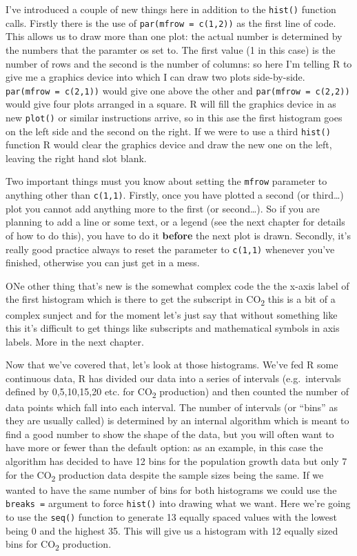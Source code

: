 \documentclass[
]{book}
\begin{document}
I've introduced a couple of new things here in addition to the \texttt{hist()} function calls. Firstly there is the use of \texttt{par(mfrow\ =\ c(1,2))} as the first line of code. This allows us to draw more than one plot: the actual number is determined by the numbers that the paramter os set to. The first value (1 in this case) is the number of rows and the second is the number of columns: so here I'm telling R to give me a graphics device into which I can draw two plots side-by-side. \texttt{par(mfrow\ =\ c(2,1))} would give one above the other and \texttt{par(mfrow\ =\ c(2,2))} would give four plots arranged in a square. R will fill the graphics device in as new \texttt{plot()} or similar instructions arrive, so in this ase the first histogram goes on the left side and the second on the right. If we were to use a third \texttt{hist()} function R would clear the graphics device and draw the new one on the left, leaving the right hand slot blank.

Two important things must you know about setting the \texttt{mfrow} parameter to anything other than \texttt{c(1,1)}. Firstly, once you have plotted a second (or third\ldots) plot you cannot add anything more to the first (or second\ldots). So if you are planning to add a line or some text, or a legend (see the next chapter for details of how to do this), you have to do it \textbf{before} the next plot is drawn. Secondly, it's really good practice always to reset the parameter to \texttt{c(1,1)} whenever you've finished, otherwise you can just get in a mess.

ONe other thing that's new is the somewhat complex code the the x-axis label of the first histogram which is there to get the subscript in CO\textsubscript{2} this is a bit of a complex sunject and for the moment let's just say that without something like this it's difficult to get things like subscripts and mathematical symbols in axis labels. More in the next chapter.

Now that we've covered that, let's look at those histograms. We've fed R some continuous data, R has divided our data into a series of intervals (e.g.~intervals defined by 0,5,10,15,20 etc. for CO\textsubscript{2} production) and then counted the number of data points which fall into each interval. The number of intervals (or ``bins'' as they are usually called) is determined by an internal algorithm which is meant to find a good number to show the shape of the data, but you will often want to have more or fewer than the default option: as an example, in this case the algorithm has decided to have 12 bins for the population growth data but only 7 for the CO\textsubscript{2} production data despite the sample sizes being the same. If we wanted to have the same number of bins for both histograms we could use the \texttt{breaks\ =} argument to force \texttt{hist()} into drawing what we want. Here we're going to use the \texttt{seq()} function to generate 13 equally spaced values with the lowest being 0 and the highest 35. This will give us a histogram with 12 equally sized bins for CO\textsubscript{2} production.
\end{document}
